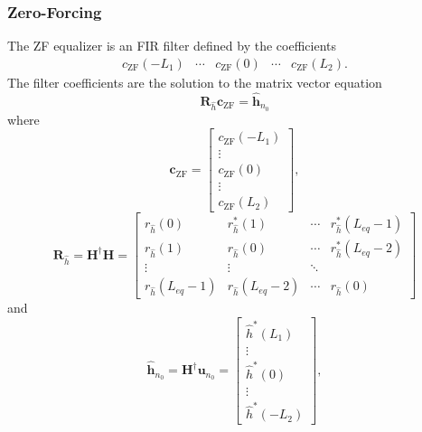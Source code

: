 \subsubsection{Zero-Forcing}
\label{sec:zero-forcing}
The ZF equalizer is an FIR filter defined by the coefficients
\begin{equation}
\begin{matrix}
c_\text{ZF}(-L_1) & \cdots & c_\text{ZF}(0) & \cdots & c_\text{ZF}(L_2).
\end{matrix}
\end{equation}
The filter coefficients are the solution to the matrix vector equation \cite[eq. (311)]{PAQ-phase1}
\begin{equation}
\mathbf{R}_{\hat{h}} \mathbf{c}_\text{ZF} = \hat{\mathbf{h}}_{n_0}
\label{eq:start_here_ZF}
\end{equation}
where
\begin{equation}
\mathbf{c}_\text{ZF} = 
\begin{bmatrix}
c_\text{ZF}(-L_1) \\ \vdots \\ c_\text{ZF}(0) \\ \vdots \\ c_\text{ZF}(L_2)
\end{bmatrix},
\end{equation}
\begin{equation}
\mathbf{R}_{\hat{h}} = 
\mathbf{H}^\dagger \mathbf{H} = 
		\begin{bmatrix}
		r_{\hat{h}}(0)			& r^\ast_{\hat{h}}(1)	& \cdots 	& r^\ast_{\hat{h}}(L_{eq}-1)  	\\
		r_{\hat{h}}(1) 			& r_{\hat{h}}(0)		& \cdots 	& r^\ast_{\hat{h}}(L_{eq}-2)  	\\
		\vdots	 				& \vdots				& \ddots 	&  								\\
		r_{\hat{h}}(L_{eq}-1)	& r_{\hat{h}}(L_{eq}-2)	& \cdots	& r_{\hat{h}}(0)  			
	\end{bmatrix}
	\label{eq:R_h}
\end{equation}
and
\begin{equation}
\hat{\mathbf{h}}_{n_0} = \mathbf{H}^\dagger \mathbf{u}_{n_0} = 
\begin{bmatrix} \hat{h}^\ast(L_1) \\ \vdots \\ \hat{h}^\ast(0) \\ \vdots \\ \hat{h}^\ast(-L_2)  \end{bmatrix},
\label{eq:h_no}
\end{equation}
